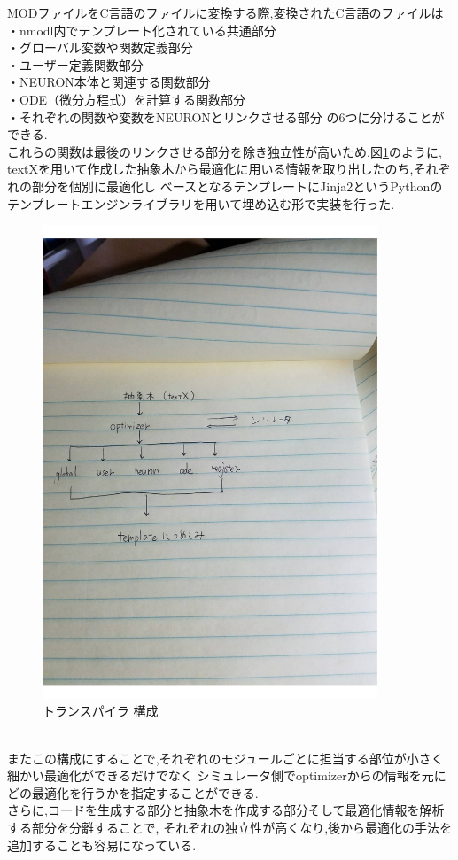 MODファイルをC言語のファイルに変換する際,変換されたC言語のファイルは\\
・nmodl内でテンプレート化されている共通部分\\
・グローバル変数や関数定義部分\\
・ユーザー定義関数部分\\
・NEURON本体と関連する関数部分\\
・ODE（微分方程式）を計算する関数部分\\
・それぞれの関数や変数をNEURONとリンクさせる部分
の6つに分けることができる.\\
これらの関数は最後のリンクさせる部分を除き独立性が高いため,図\ref{fig:transpiler}のように,
textXを用いて作成した抽象木から最適化に用いる情報を取り出したのち,それぞれの部分を個別に最適化し
ベースとなるテンプレートにJinja2というPythonのテンプレートエンジンライブラリを用いて埋め込む形で実装を行った.\\
\begin{figure}[htb]
  \begin{center}
    \includegraphics[width=10.0cm]{./images/transpiler.pdf}
    \caption{トランスパイラ 構成}
    \label{fig:transpiler}
  \end{center}
\end{figure}~\\
またこの構成にすることで,それぞれのモジュールごとに担当する部位が小さく細かい最適化ができるだけでなく
シミュレータ側でoptimizerからの情報を元にどの最適化を行うかを指定することができる.\\
さらに,コードを生成する部分と抽象木を作成する部分そして最適化情報を解析する部分を分離することで,
それぞれの独立性が高くなり,後から最適化の手法を追加することも容易になっている.\\

